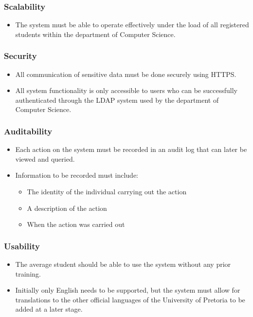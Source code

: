 \documentclass[11pt,a4paper]{article}
\begin{document}
	\subsubsection{Scalability}
	\begin{itemize}
		\item The system must be able to operate effectively under the load of all registered students within the department of Computer Science.
	\end{itemize}
		
	\subsubsection{Security}
	\begin{itemize}
		\item All communication of sensitive data must be done securely using HTTPS.
		\item All system functionality is only accessible to users who can be successfully authenticated through the LDAP system used by the department of Computer Science.
	\end{itemize}
	
	\subsubsection{Auditability}
	\begin{itemize}
		\item Each action on the system must be recorded in an audit log that can later be viewed and queried.
		\item Information to be recorded must include:
		\begin{itemize}
			\item The identity of the individual carrying out the action
			\item A description of the action
			\item When the action was carried out
		\end{itemize}
	\end{itemize}
	
	\subsubsection{Usability}
	\begin{itemize}
		\item The average student should be able to use the system without any prior training.
		\item Initially only English needs to be supported, but the system must allow for translations to the other official languages of the University of Pretoria to be added at a later stage.
	\end{itemize}
	
\end{document}
